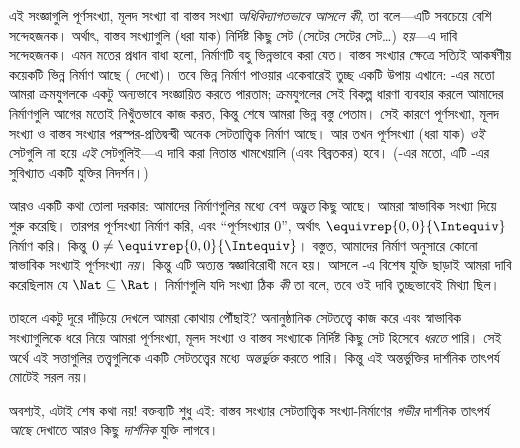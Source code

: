 \documentclass[../../../include/open-logic-section]{subfiles}
\begin{document}
এই সংজ্ঞাগুলি পূর্ণসংখ্যা, মূলদ সংখ্যা বা বাস্তব সংখ্যা \emph{অধিবিদ্যাগতভাবে আসলে কী}, তা বলে—এটি সবচেয়ে বেশি সন্দেহজনক। অর্থাৎ, বাস্তব সংখ্যাগুলি (ধরা যাক) নির্দিষ্ট কিছু সেট (সেটের সেটের সেট\ldots) \emph{হয়}—এ দাবি সন্দেহজনক। এমন মতের প্রধান বাধা হলো, নির্মাণটি বহু ভিন্নভাবে করা যেত। বাস্তব সংখ্যার ক্ষেত্রে সত্যিই আকর্ষণীয় কয়েকটি ভিন্ন নির্মাণ আছে ( দেখো)। তবে ভিন্ন নির্মাণ পাওয়ার একেবারেই তুচ্ছ একটি উপায় এখানে: -এর মতো আমরা ক্রমযুগলকে একটু অন্যভাবে সংজ্ঞায়িত করতে পারতাম; ক্রমযুগলের সেই বিকল্প ধারণা ব্যবহার করলে আমাদের নির্মাণগুলি আগের মতোই নিখুঁতভাবে কাজ করত, কিন্তু শেষে আমরা ভিন্ন বস্তু পেতাম। সেই কারণে পূর্ণসংখ্যা, মূলদ সংখ্যা ও বাস্তব সংখ্যার পরস্পর-প্রতিদ্বন্দ্বী অনেক সেটতাত্ত্বিক নির্মাণ আছে। আর তখন পূর্ণসংখ্যা (ধরা যাক) \emph{ওই} সেটগুলি না হয়ে \emph{এই} সেটগুলিই—এ দাবি করা নিতান্ত খামখেয়ালি (এবং বিব্রতকর) হবে। (-এর মতো, এটি \citealt{Benacerraf1965}-এর সুবিখ্যাত একটি যুক্তির নিদর্শন।)

আরও একটি কথা তোলা দরকার: আমাদের নির্মাণগুলির মধ্যে বেশ \emph{অদ্ভুত} কিছু আছে। আমরা স্বাভাবিক সংখ্যা দিয়ে শুরু করেছি। তারপর পূর্ণসংখ্যা নির্মাণ করি, এবং ``পূর্ণসংখ্যার $0$'', অর্থাৎ $ \equivrep{0,0}{\Intequiv}$ নির্মাণ করি। কিন্তু $0 \neq
\equivrep{0,0}{\Intequiv}$। বস্তুত, আমাদের নির্মাণ অনুসারে কোনো স্বাভাবিক সংখ্যাই পূর্ণসংখ্যা \emph{নয়}। কিন্তু এটি অত্যন্ত স্বজ্ঞাবিরোধী মনে হয়। আসলে -এ বিশেষ যুক্তি ছাড়াই আমরা দাবি করেছিলাম যে $\Nat \subseteq \Rat$। নির্মাণগুলি যদি সংখ্যা ঠিক \emph{কী} তা বলে, তবে ওই দাবি তুচ্ছভাবেই মিথ্যা ছিল।

তাহলে একটু দূরে দাঁড়িয়ে দেখলে আমরা কোথায় পৌঁছাই? অনানুষ্ঠানিক সেটতত্ত্বে কাজ করে এবং স্বাভাবিক সংখ্যাগুলিকে ধরে নিয়ে আমরা পূর্ণসংখ্যা, মূলদ সংখ্যা ও বাস্তব সংখ্যাকে নির্দিষ্ট কিছু সেট হিসেবে \emph{ধরতে} পারি। সেই অর্থে এই সত্তাগুলির তত্ত্বগুলিকে একটি সেটতত্ত্বের মধ্যে \emph{অন্তর্ভুক্ত} করতে পারি। কিন্তু এই অন্তর্ভুক্তির দার্শনিক তাৎপর্য মোটেই সরল নয়।

অবশ্যই, এটাই শেষ কথা নয়!{} বক্তব্যটি শুধু এই: বাস্তব সংখ্যার সেটতাত্ত্বিক সংখ্যা-নির্মাণের \emph{গভীর} দার্শনিক তাৎপর্য \emph{আছে} দেখাতে আরও কিছু \emph{দার্শনিক} যুক্তি লাগবে।

\end{document}
